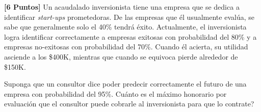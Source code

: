\documentclass[ a4paper, twoside, 11pt]{article}
\begin{document}
\begin{problem}
\textbf{[6 Puntos]} Un acaudalado inversionista tiene una empresa que se dedica a identificar \emph{start-ups} prometedoras. De las empresas que \'el usualmente eval\'ua, se sabe que generalmente solo el 40\% tendr\'a \'exito. Actualmente, el inversionista logra identificar correctamente a empresas exitosas con probabilidad del 80\% y a empresas no-exitosas con probabilidad del 70\%. Cuando \'el acierta, su utilidad asciende a los \$400K, mientras que cuando se equivoca pierde alrededor de \$150K. 

Suponga que un consultor dice poder predecir correctamente el futuro de una empresa con probabilidad del 95\%. Cu\'anto es el m\'aximo honorario por evaluaci\'on que el consultor puede cobrarle al inversionista para que lo contrate? 

\end{problem}
\fullskip
\end{document}
